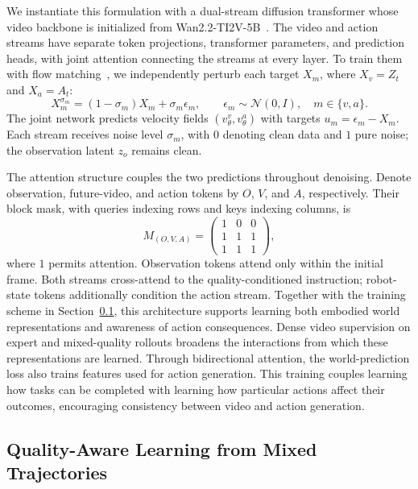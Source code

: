 We instantiate this formulation with a dual-stream diffusion transformer whose video backbone is initialized from Wan2.2-TI2V-5B~\citep{wan2025}.
The video and action streams have separate token projections, transformer parameters, and prediction heads, with joint attention connecting the streams at every layer.
To train them with flow matching~\citep{lipman2023flow}, we independently perturb each target $X_m$, where $X_v=Z_t$ and $X_a=A_t$:
\begin{equation}
    X_m^{\sigma_m}=(1-\sigma_m)X_m+\sigma_m\epsilon_m,
    \qquad \epsilon_m\sim\mathcal N(0,I),\quad m\in\{v,a\}.
    \label{eq:flow_path}
\end{equation}
The joint network predicts velocity fields $(v_\theta^v,v_\theta^a)$ with targets $u_m=\epsilon_m-X_m$.
Each stream receives noise level $\sigma_m$, with $0$ denoting clean data and $1$ pure noise; the observation latent $z_o$ remains clean.

The attention structure couples the two predictions throughout denoising.
Denote observation, future-video, and action tokens by $O$, $V$, and $A$, respectively.
Their block mask, with queries indexing rows and keys indexing columns, is
\begin{equation}
    M_{(O,V,A)}=
    \begin{pmatrix}
        1 & 0 & 0\\
        1 & 1 & 1\\
        1 & 1 & 1
    \end{pmatrix},
    \label{eq:joint_mask}
\end{equation}
where $1$ permits attention.
Observation tokens attend only within the initial frame.
Both streams cross-attend to the quality-conditioned instruction; robot-state tokens additionally condition the action stream.
Together with the training scheme in Section~\ref{sec:quality_steering}, this architecture supports learning both embodied world representations and awareness of action consequences.
Dense video supervision on expert and mixed-quality rollouts broadens the interactions from which these representations are learned.
Through bidirectional attention, the world-prediction loss also trains features used for action generation.
This training couples learning how tasks can be completed with learning how particular actions affect their outcomes, encouraging consistency between video and action generation.

\subsection{Quality-Aware Learning from Mixed Trajectories}
\label{sec:quality_steering}

